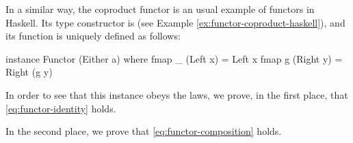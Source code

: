 \begin{example}
  \label{ex:functor-coproduct-haskell}


  In a similar way, the coproduct functor is an usual example of
  functors in Haskell. Its type constructor is 
  (see Example \ref{ex:functor-coproduct-haskell}), and its
   function is uniquely defined as follows:
  \begin{codehaskell}
instance Functor (Either a) where
  fmap _ (Left x)  = Left x
  fmap g (Right y) = Right (g y)
  \end{codehaskell}
  In order to see that this instance obeys the laws, we prove, in the
  first place, that \eqref{eq:functor-identity} holds.

  \vspace{1em}
  \begin{steps}
  \end{steps}
  \begin{steps}
  \end{steps}
  In the second place, we prove that \eqref{eq:functor-composition}
  holds.

  \vspace{1em}
  \begin{steps}
  \end{steps}
  \begin{steps}
  \end{steps}

\end{example}

